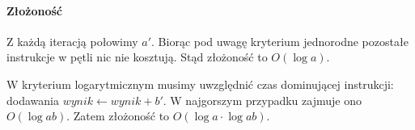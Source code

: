
\paragraph{Złożoność}

Z każdą iteracją połowimy $a'$. 
Biorąc pod uwagę kryterium jednorodne pozostałe instrukcje w pętli nic nie kosztują. 
Stąd złożoność to $O(\log a)$.

W kryterium logarytmicznym musimy uwzględnić czas dominującej instrukcji: dodawania  $wynik \leftarrow wynik + b'$. 
W najgorszym przypadku zajmuje ono $O(\log ab)$. Zatem złożoność to $O(\log a \cdot \log ab)$.

